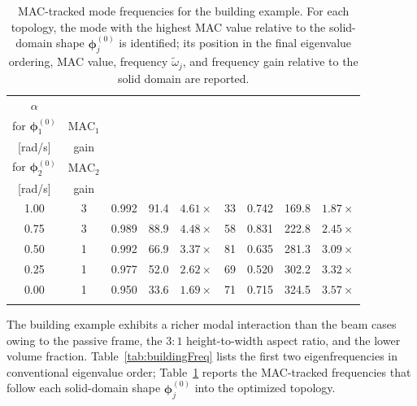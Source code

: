 \documentclass[pdflatex,lineno,sn-mathphys-ay]{sn-jnl}
\begin{document}
\begin{table}[htbp]
\centering
\caption{MAC-tracked mode frequencies for the building example. For each topology, the mode with the highest MAC value relative to the solid-domain shape $\boldsymbol{\phi}_j^{(0)}$ is identified; its position in the final eigenvalue ordering, MAC value, frequency $\tilde{\omega}_j$, and frequency gain relative to the solid domain are reported.}
\label{tab:buildingMAC}
\setlength{\tabcolsep}{3pt}
\renewcommand\arraystretch{1.1}
\footnotesize
\begin{tabular*}{\textwidth}{@{\extracolsep{\fill}}ccccccccc}
\Xhline{1.2pt}
$\alpha$ & \makecell{MAC-best mode\\for $\boldsymbol{\phi}_1^{(0)}$} & $\mathrm{MAC}_1$ & \makecell{$\tilde{\omega}_1$\\{[rad/s]}} & gain & \makecell{MAC-best mode\\for $\boldsymbol{\phi}_2^{(0)}$} & $\mathrm{MAC}_2$ & \makecell{$\tilde{\omega}_2$\\{[rad/s]}} & gain \\
\Xhline{1.2pt}
1.00 & 3 & 0.992 &  91.4 & $4.61\times$ & 33 & 0.742 & 169.8 & $1.87\times$ \\
0.75 & 3 & 0.989 &  88.9 & $4.48\times$ & 58 & 0.831 & 222.8 & $2.45\times$ \\
0.50 & 1 & 0.992 &  66.9 & $3.37\times$ & 81 & 0.635 & 281.3 & $3.09\times$ \\
0.25 & 1 & 0.977 &  52.0 & $2.62\times$ & 69 & 0.520 & 302.2 & $3.32\times$ \\
0.00 & 1 & 0.950 &  33.6 & $1.69\times$ & 71 & 0.715 & 324.5 & $3.57\times$ \\
\Xhline{1.2pt}
\end{tabular*}
\end{table}

The building example exhibits a richer modal interaction than the beam cases owing to the passive frame, the $3:1$ height-to-width aspect ratio, and the lower volume fraction. Table~\ref{tab:buildingFreq} lists the first two eigenfrequencies in conventional eigenvalue order; Table~\ref{tab:buildingMAC} reports the MAC-tracked frequencies that follow each solid-domain shape $\boldsymbol{\phi}_j^{(0)}$ into the optimized topology.
\end{document}
